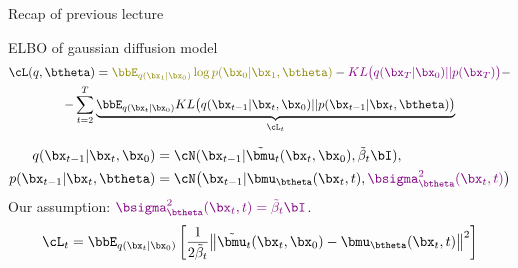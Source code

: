 

\usepackage{tikz}

\usetikzlibrary{arrows,shapes,positioning,shadows,trees}

\begin{frame}
\titlepage
\end{frame}
\begin{frame}{Recap of previous lecture}
	\begin{block}{ELBO of gaussian diffusion model}
		\vspace{-0.7cm}
		\begin{multline*}
			\cL(q, \btheta) =  {\color{olive}\bbE_{q(\bx_1 | \bx_0)} \log p(\bx_0 | \bx_1, \btheta)} - {\color{violet}KL\bigl(q(\bx_T | \bx_0) || p(\bx_T)\bigr)} - \\
			- \sum_{t=2}^T  \underbrace{ \bbE_{q(\bx_t | \bx_0)}KL \bigl(q(\bx_{t-1} | \bx_t, \bx_0) || p(\bx_{t - 1} | \bx_t, \btheta )\bigr)}_{\cL_t}
		\end{multline*}
		\vspace{-1.0cm}
	\end{block}
	\begin{align*}
		q(\bx_{t-1} | \bx_t, \bx_0) &= \cN(\bx_{t-1} | \tilde{\bmu}_t(\bx_t, \bx_0), \tilde{\beta}_t \bI), \\
		p(\bx_{t - 1} | \bx_t, \btheta) &= \cN \bigl(\bx_{t - 1} | \bmu_{\btheta}(\bx_t, t), {\color{violet}\bsigma_{\btheta}^2(\bx_t, t)}\bigr)
	\end{align*}
	Our assumption:	${\color{violet}\bsigma_{\btheta}^2(\bx_t, t) = \tilde{\beta}_t \bI}$.
	\[
		\cL_t = \bbE_{q(\bx_t | \bx_0)} \left[\frac{1}{2\tilde{\beta}_t} \bigl\| \tilde{\bmu}_t(\bx_t, \bx_0) - \bmu_{\btheta}(\bx_t, t) \bigr\|^2  \right]
	\]
\end{frame}
